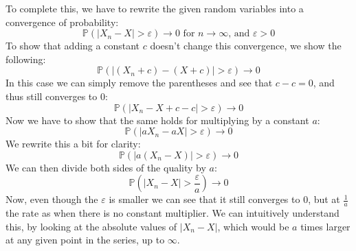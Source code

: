 To complete this, we have to rewrite the given random variables into a convergence of probability:
$$
\mathbb{P}(|X_n-X| > \varepsilon) \rightarrow 0 \text{ for } n \rightarrow \infty \text{, and } \varepsilon > 0
$$
To show that adding a constant $c$ doesn't change this convergence, we show the following:
$$
\mathbb{P}(|(X_n+c)-(X+c)| > \varepsilon) \rightarrow 0
$$
In this case we can simply remove the parentheses and see that $c-c = 0$, and thus still converges to $0$:
$$
\mathbb{P}(|X_n-X +c-c| > \varepsilon) \rightarrow 0
$$
Now we have to show that the same holds for multiplying by a constant $a$:
$$
\mathbb{P}(|aX_n-aX| > \varepsilon) \rightarrow 0
$$
We rewrite this a bit for clarity:
$$
\mathbb{P}(|a(X_n-X)| > \varepsilon) \rightarrow 0
$$
We can then divide both sides of the quality by $a$:
$$
\mathbb{P}(|X_n-X| > \frac{\varepsilon}{a}) \rightarrow 0
$$
Now, even though the $\varepsilon$ is smaller we can see that it still converges to $0$, but at $\frac{1}{a}$ the rate as when there is no constant multiplier. We can intuitively understand this, by looking at the absolute values of $|X_n-X|$, which would be $a$ times larger at any given point in the series, up to $\infty$.